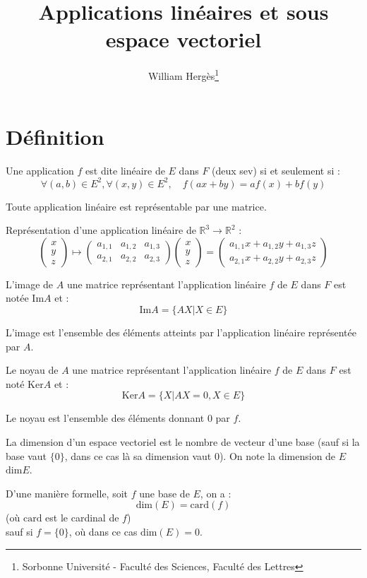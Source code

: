 \documentclass[a4paper, titlepage]{article}
\title{Applications linéaires et sous espace vectoriel}
\author{William Hergès\thanks{Sorbonne Université - Faculté des Sciences, Faculté des Lettres}}
\begin{document}
	\maketitle
	\tableofcontents
	\newpage
	\section{Définition}
	\begin{defn}
		Une application $f$ est dite linéaire de $E$ dans $F$ (deux sev) si et seulement si :
		$$ \forall (a,b)\in E^2,\forall (x,y)\in E^2,\quad f(ax+by) = af(x)+bf(y) $$
	\end{defn}
	\begin{thm}
		Toute application linéaire est représentable par une matrice.
	\end{thm}
	\begin{exemple}
		Représentation d'une application linéaire de $\mathbb{R}^3\to \mathbb{R}^2$ :
		$$ \begin{pmatrix} x\\y\\z \end{pmatrix} \longmapsto \begin{pmatrix} a_{1,1}&a_{1,2}&a_{1,3}\\a_{2,1}&a_{2,2}&a_{2,3} \end{pmatrix} \begin{pmatrix} x\\y\\z \end{pmatrix}  = \begin{pmatrix} a_{1,1}x+a_{1,2}y+a_{1,3}z\\a_{2,1}x+a_{2,2}y+a_{2,3}z \end{pmatrix} $$
	\end{exemple}
	\begin{defn}
		L'image de $A$ une matrice représentant l'application linéaire $f$ de $E$ dans $F$ est notée $\mathrm{Im}A$ et :
		$$ \mathrm{Im}A =\{AX|X\in E\}$$
	\end{defn}
	L'image est l'ensemble des éléments atteints par l'application linéaire représentée par $A$.
	\begin{defn}
		Le noyau de $A$ une matrice représentant l'application linéaire $f$ de $E$ dans $F$ est noté $\mathrm{Ker}A$ et :
		$$ \mathrm{Ker}A=\{X| AX = 0, X\in E\} $$
	\end{defn}
	Le noyau est l'ensemble des éléments donnant 0 par $f$.
	\begin{defn}
		La dimension d'un espace vectoriel est le nombre de vecteur d'une base (sauf si la base vaut $\{0\}$, dans ce cas là sa dimension vaut 0). On note la dimension de $E$ $\mathrm{dim}E$.

		D'une manière formelle, soit $f$ une base de $E$, on a :
		$$ \mathrm{dim}(E)=\mathrm{card}(f) $$
		(où $\mathrm{card}$ est le cardinal de $f$)\\
		sauf si $f=\{0\}$, où dans ce cas $\mathrm{dim}(E)=0$. 
	\end{defn}
\end{document}
